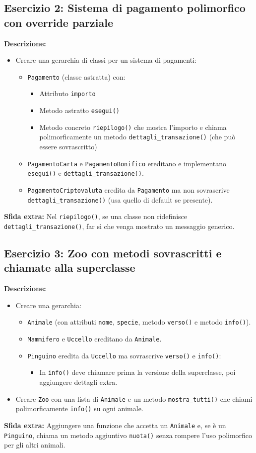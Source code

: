 \documentclass{article}
\begin{document}
\subsection*{Esercizio 2: Sistema di pagamento polimorfico con override parziale}
\textbf{Descrizione:}
\begin{itemize}
    \item Creare una gerarchia di classi per un sistema di pagamenti:
    \begin{itemize}
        \item \texttt{Pagamento} (classe astratta) con:
        \begin{itemize}
            \item Attributo \texttt{importo}
            \item Metodo astratto \texttt{esegui()}
            \item Metodo concreto \texttt{riepilogo()} che mostra l'importo e chiama polimorficamente un metodo \texttt{dettagli\_transazione()} (che può essere sovrascritto)
        \end{itemize}
        \item \texttt{PagamentoCarta} e \texttt{PagamentoBonifico} ereditano e implementano \texttt{esegui()} e \texttt{dettagli\_transazione()}.
        \item \texttt{PagamentoCriptovaluta} eredita da \texttt{Pagamento} ma non sovrascrive \texttt{dettagli\_transazione()} (usa quello di default se presente).
    \end{itemize}
\end{itemize}

\textbf{Sfida extra:}  
Nel \texttt{riepilogo()}, se una classe non ridefinisce \texttt{dettagli\_transazione()}, far sì che venga mostrato un messaggio generico.

\subsection*{Esercizio 3: Zoo con metodi sovrascritti e chiamate alla superclasse}
\textbf{Descrizione:}
\begin{itemize}
    \item Creare una gerarchia:
    \begin{itemize}
        \item \texttt{Animale} (con attributi \texttt{nome}, \texttt{specie}, metodo \texttt{verso()} e metodo \texttt{info()}).
        \item \texttt{Mammifero} e \texttt{Uccello} ereditano da \texttt{Animale}.
        \item \texttt{Pinguino} eredita da \texttt{Uccello} ma sovrascrive \texttt{verso()} e \texttt{info()}:
        \begin{itemize}
            \item In \texttt{info()} deve chiamare prima la versione della superclasse, poi aggiungere dettagli extra.
        \end{itemize}
    \end{itemize}
    \item Creare \texttt{Zoo} con una lista di \texttt{Animale} e un metodo \texttt{mostra\_tutti()} che chiami polimorficamente \texttt{info()} su ogni animale.
\end{itemize}

\textbf{Sfida extra:}  
Aggiungere una funzione che accetta un \texttt{Animale} e, se è un \texttt{Pinguino}, chiama un metodo aggiuntivo \texttt{nuota()} senza rompere l’uso polimorfico per gli altri animali.
\end{document}
